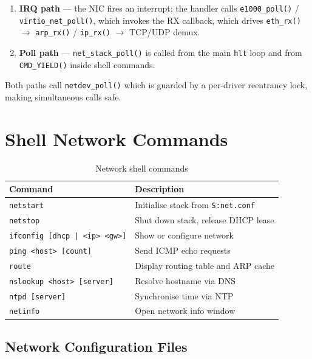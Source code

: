 \documentclass[11pt,a4paper]{report}
\begin{document}
\begin{enumerate}
  \item \textbf{IRQ path} --- the NIC fires an interrupt; the handler calls
        \texttt{e1000\_poll()} / \texttt{virtio\_net\_poll()}, which invokes
        the RX callback, which drives \texttt{eth\_rx()} $\to$ \texttt{arp\_rx()} /
        \texttt{ip\_rx()} $\to$ TCP/UDP demux.
  \item \textbf{Poll path} --- \texttt{net\_stack\_poll()} is called from the
        main \texttt{hlt} loop and from \texttt{CMD\_YIELD()} inside shell commands.
\end{enumerate}

Both paths call \texttt{netdev\_poll()} which is guarded by a per-driver
reentrancy lock, making simultaneous calls safe.

\section{Shell Network Commands}

\begin{table}[h]
\centering
\begin{tabular}{ll}
\toprule
\textbf{Command} & \textbf{Description} \\
\midrule
\texttt{netstart} & Initialise stack from \texttt{S:net.conf} \\
\texttt{netstop} & Shut down stack, release DHCP lease \\
\texttt{ifconfig [dhcp | <ip> <gw>]} & Show or configure network \\
\texttt{ping <host> [count]} & Send ICMP echo requests \\
\texttt{route} & Display routing table and ARP cache \\
\texttt{nslookup <host> [server]} & Resolve hostname via DNS \\
\texttt{ntpd [server]} & Synchronise time via NTP \\
\texttt{netinfo} & Open network info window \\
\bottomrule
\end{tabular}
\caption{Network shell commands}
\end{table}

\subsection{Network Configuration Files}
\end{document}
